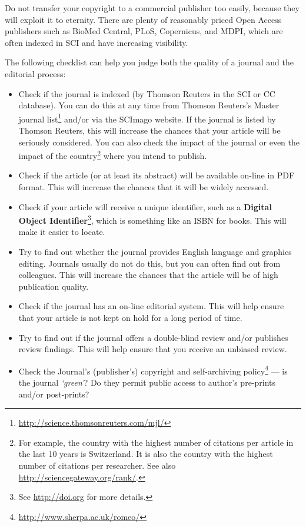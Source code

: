 \documentclass[graybox,envcountchap,sectrefs,UStrade]{svmono}
\begin{document}
\begin{svgraybox}
Do not transfer your copyright to a commercial publisher too easily, because they will exploit it to eternity. There are plenty of reasonably priced Open Access publishers such as BioMed Central, PLoS, Copernicus, and MDPI, which are often indexed in SCI and have increasing visibility.
\end{svgraybox}\label{R:dontgiveC}

The following checklist can help you judge both the quality of a journal and the editorial process:

\begin{itemize}
 \item Check if the journal is indexed (by Thomson Reuters in the SCI or CC database). You can do this at any time from Thomson Reuters's Master journal list\footnote{\url{http://science.thomsonreuters.com/mjl/}} and/or via the SCImago website. If the journal is listed by Thomson Reuters, this will increase the chances that your article will be seriously considered. You can also check the impact of the journal or even the impact of the country\footnote{For example, the country with the highest number of citations per article in the last 10 years is Switzerland. It is also the country with the highest number of citations per researcher. See also \url{http://sciencegateway.org/rank/}.} where you intend to publish.
 \item Check if the article (or at least its abstract) will be available on-line in PDF format. This will increase the chances that it will be widely accessed.
 \item Check if your article will receive a unique identifier, such as a \textbf{Digital Object  Identifier}\footnote{See \url{http://doi.org} for more details.}, which is something like an ISBN for books. This will make it easier to locate.
 \item Try to find out whether the journal provides English language and graphics editing. Journals usually do not do this, but you can often find out from colleagues. This will increase the chances that the article will be of high publication quality.
 \item Check if the journal has an on-line editorial system. This will help ensure that your article is not kept on hold for a long period of time.
 \item Try to find out if the journal offers a double-blind review and/or publishes review findings. This will help ensure that you receive an unbiased review.
 \item Check the Journal's (publisher's) copyright and self-archiving policy\footnote{\url{http://www.sherpa.ac.uk/romeo/}} --- is the journal \emph{`green'}? Do they permit public access to author's pre-prints and/or post-prints?
\end{itemize}
\end{document}
